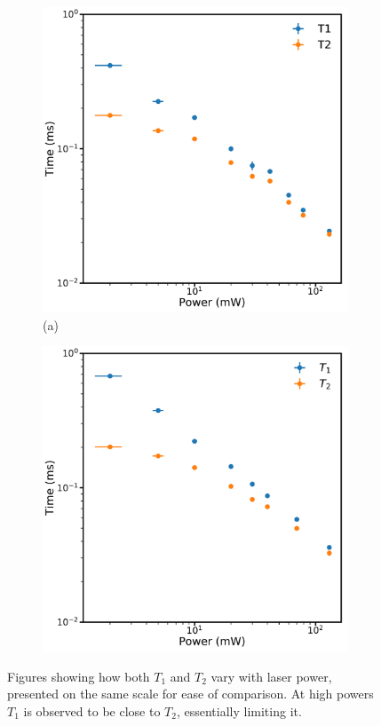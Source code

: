 \begin{figure}
\centering
\begin{subfigure}[b]{0.5\columnwidth}
\includegraphics[width = \columnwidth]{Figures/8kT1vsT21058.pdf}{(a)}
\end{subfigure}%
\begin{subfigure}[b]{0.5\columnwidth}
\includegraphics[width=\columnwidth]{Figures/T1vsT11070.pdf}
\end{subfigure}%
\caption[$T_1$ vs $T_2$ for 1058~nm and 1070~nm]{Figures showing how both $T_1$ and $T_2$ vary with laser power, presented on the same scale for ease of comparison. At high powers $T_1$ is observed to be close to $T_2$, essentially limiting it. }
\label{fig:t1vst2wav}
\end{figure}

